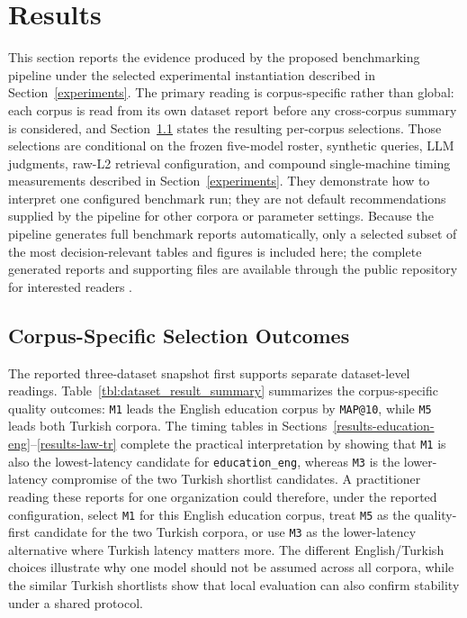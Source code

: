 \section{Results}\label{results}

This section reports the evidence produced by the proposed benchmarking pipeline under the selected experimental instantiation described in Section~\ref{experiments}. The primary reading is corpus-specific rather than global: each corpus is read from its own dataset report before any cross-corpus summary is considered, and Section~\ref{cross-dataset-headline-findings} states the resulting per-corpus selections. Those selections are conditional on the frozen five-model roster, synthetic queries, LLM judgments, raw-L2 retrieval configuration, and compound single-machine timing measurements described in Section~\ref{experiments}. They demonstrate how to interpret one configured benchmark run; they are not default recommendations supplied by the pipeline for other corpora or parameter settings. Because the pipeline generates full benchmark reports automatically, only a selected subset of the most decision-relevant tables and figures is included here; the complete generated reports and supporting files are available through the public repository for interested readers \citep{GitHub_RagRetrievalBench}.

\subsection{Corpus-Specific Selection Outcomes}\label{cross-dataset-headline-findings}

The reported three-dataset snapshot first supports separate dataset-level readings. Table~\ref{tbl:dataset_result_summary} summarizes the corpus-specific quality outcomes: \texttt{M1} leads the English education corpus by \texttt{MAP@10}, while \texttt{M5} leads both Turkish corpora. The timing tables in Sections~\ref{results-education-eng}--\ref{results-law-tr} complete the practical interpretation by showing that \texttt{M1} is also the lowest-latency candidate for \texttt{education\_eng}, whereas \texttt{M3} is the lower-latency compromise of the two Turkish shortlist candidates. A practitioner reading these reports for one organization could therefore, under the reported configuration, select \texttt{M1} for this English education corpus, treat \texttt{M5} as the quality-first candidate for the two Turkish corpora, or use \texttt{M3} as the lower-latency alternative where Turkish latency matters more. The different English/Turkish choices illustrate why one model should not be assumed across all corpora, while the similar Turkish shortlists show that local evaluation can also confirm stability under a shared protocol.

